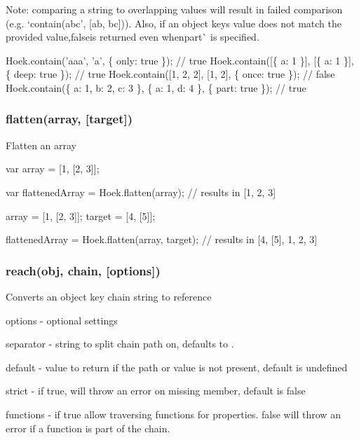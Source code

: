 Note\+: comparing a string to overlapping values will result in failed comparison (e.\+g. `contain(\textquotesingle{}abc', \mbox{[}\textquotesingle{}ab\textquotesingle{}, \textquotesingle{}bc\textquotesingle{}\mbox{]}){\ttfamily ). Also, if an object key\textquotesingle{}s value does not match the provided value,}false{\ttfamily is returned even when}part\`{} is specified.


\begin{DoxyCode}
Hoek.contain('aaa', 'a', \{ only: true \});                           // true
Hoek.contain([\{ a: 1 \}], [\{ a: 1 \}], \{ deep: true \});               // true
Hoek.contain([1, 2, 2], [1, 2], \{ once: true \});                    // false
Hoek.contain(\{ a: 1, b: 2, c: 3 \}, \{ a: 1, d: 4 \}, \{ part: true \}); // true
\end{DoxyCode}


\subsubsection*{flatten(array, \mbox{[}target\mbox{]})}

Flatten an array


\begin{DoxyCode}
var array = [1, [2, 3]];

var flattenedArray = Hoek.flatten(array); // results in [1, 2, 3]

array = [1, [2, 3]];
target = [4, [5]];

flattenedArray = Hoek.flatten(array, target); // results in [4, [5], 1, 2, 3]
\end{DoxyCode}


\subsubsection*{reach(obj, chain, \mbox{[}options\mbox{]})}

Converts an object key chain string to reference


\begin{DoxyItemize}
\item {\ttfamily options} -\/ optional settings
\begin{DoxyItemize}
\item {\ttfamily separator} -\/ string to split chain path on, defaults to \textquotesingle{}.\textquotesingle{}
\item {\ttfamily default} -\/ value to return if the path or value is not present, default is {\ttfamily undefined}
\item {\ttfamily strict} -\/ if {\ttfamily true}, will throw an error on missing member, default is {\ttfamily false}
\item {\ttfamily functions} -\/ if {\ttfamily true} allow traversing functions for properties. {\ttfamily false} will throw an error if a function is part of the chain.
\end{DoxyItemize}
\end{DoxyItemize}

